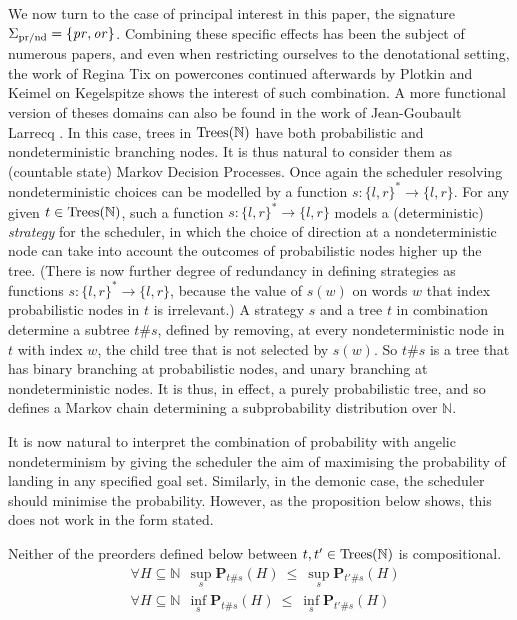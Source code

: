 We now turn to the case of principal interest in this paper, the signature $\Sigma_{\text{pr/nd}} = \{\operatorname{\mathit{pr}},\operatorname{\mathit{or}}\}$.
Combining these specific effects has been 
the subject of numerous papers, and even when restricting ourselves to the 
denotational setting, the work of Regina Tix on powercones \cite{tix2009semantic} 
continued afterwards by Plotkin and Keimel \cite{KeimelP2016} on Kegelspitze
shows the interest of such combination.
A more functional version of theses domains can also be found in the work of Jean-Goubault Larrecq 
\cite{JGL-mscs16}.
In this case, trees in $\textnormal{Trees}(\mathbb{N})$ have both probabilistic and nondeterministic branching nodes.
It is thus natural to consider them as (countable state) Markov Decision Processes. Once again the 
scheduler resolving nondeterministic
choices can be modelled by a 
function $s: \{l,r\}^* \to \{l,r\}$. For any given $t \in \textnormal{Trees}(\mathbb{N})$, such a function
$s: \{l,r\}^* \to \{l,r\}$ models a (deterministic) \emph{strategy} for the scheduler, in which the choice of direction at a nondeterministic node  
can take into account the outcomes of probabilistic nodes higher up the tree.
(There is now further degree of redundancy in defining strategies as functions $s: \{l,r\}^* \to \{l,r\}$, because the value of $s(w)$ on words $w$ that index 
probabilistic nodes in $t$ is irrelevant.) A strategy $s$ and a tree $t$ in combination determine a subtree $t\#s$, defined by 
removing, at every nondeterministic node in $t$ with index $w$, the child tree that is not selected by $s(w)$. So $t\#s$ is a tree that has binary branching at probabilistic nodes, and unary branching at nondeterministic nodes. It is thus, in effect, a purely probabilistic tree, and so defines a Markov chain determining a subprobability distribution over $\mathbb{N}$. 

It is now natural to interpret the combination of probability with angelic nondeterminism 
by giving the scheduler the aim of maximising the probability of landing in any specified goal set. Similarly, in the demonic case, the scheduler should minimise the probability. However, as the proposition below shows, 
this does not work in the form stated. 
\begin{aproposition}
Neither of the preorders defined below between $t,t' \in \textnormal{Trees}(\mathbb{N})$ is compositional.
\begin{align*}
& \forall H \subseteq \mathbb{N}  ~~ \sup_s  \mathbf{P}_{t\#s} (H)~ \leq~ \sup_s \mathbf{P}_{t'\#s} (H)
\\
& \forall H \subseteq \mathbb{N}  ~~ \inf_s  \mathbf{P}_{t\#s} (H)~ \leq~ \inf_s \mathbf{P}_{t'\#s} (H)
\end{align*}
\end{aproposition}

